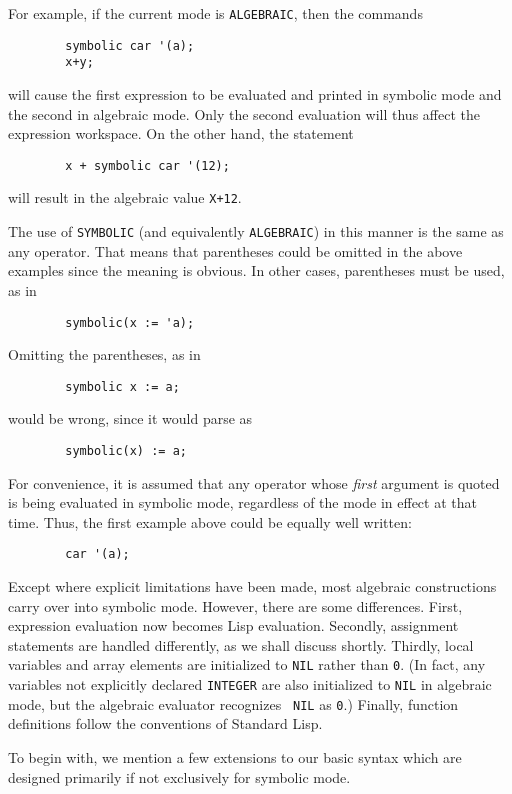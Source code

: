 For example, if the current mode is {\tt ALGEBRAIC}, then the commands
\extendedmanual{\newpage}
\begin{verbatim}
        symbolic car '(a);
        x+y;
\end{verbatim}
will cause the first expression to be evaluated and printed in symbolic
mode and the second in algebraic mode. Only the second evaluation will
thus affect the expression workspace. On the other hand, the statement
\begin{verbatim}
        x + symbolic car '(12);
\end{verbatim}
will result in the algebraic value {\tt X+12}.

The use of {\tt SYMBOLIC} (and equivalently {\tt ALGEBRAIC}) in this
manner is the same as any operator.  That means that parentheses could be
omitted in the above examples since the meaning is obvious.  In other
cases, parentheses must be used, as in

\begin{verbatim}
        symbolic(x := 'a);
\end{verbatim}
Omitting the parentheses, as in
\begin{verbatim}
        symbolic x := a;
\end{verbatim}
would be wrong, since it would parse as
\begin{verbatim}
        symbolic(x) := a;
\end{verbatim}
For convenience, it is assumed that any operator whose {\em first\/} argument is
quoted is being evaluated in symbolic mode, regardless of the mode in
effect at that time. Thus, the first example above could be equally well
written:
\begin{verbatim}
        car '(a);
\end{verbatim}
Except where explicit limitations have been made, most {\REDUCE} algebraic
constructions carry over into symbolic mode.
However, there are some differences.  First, expression evaluation now
becomes Lisp evaluation.  Secondly, assignment statements are handled
differently, as we shall discuss shortly.  Thirdly, local variables and array
elements are initialized to {\tt NIL} rather than {\tt 0}. (In fact, any
variables not explicitly declared {\tt INTEGER} are also initialized to
{\tt NIL} in algebraic mode, but the algebraic evaluator recognizes {\tt
NIL} as {\tt 0}.) Finally, function definitions follow the conventions of
Standard Lisp.

To begin with, we mention a few extensions to our basic syntax which are
designed primarily if not exclusively for symbolic mode.

